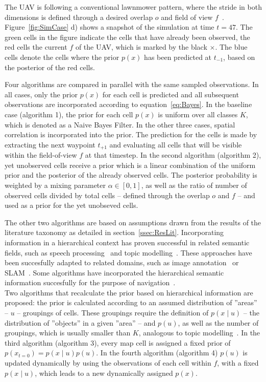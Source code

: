 \documentclass[twocolumn,letterpaper]{IEEEAerospaceCLS}  %
\begin{document}
The UAV is following a conventional lawnmower pattern, where the stride in both dimensions is defined through a desired overlap $o$ and field of view $f$~\cite{shetty_implementation_2020}. Figure~\ref{fig:SimCase} d) shows a snapshot of the simulation at time $t=47$. The green cells in the figure indicate the cells that have already been observed, the red cells the current $f$ of the UAV, which is marked by the black $\pmb{\times}$. The blue cells denote the cells where the prior $p(x)$ has been predicted at $t_{-1}$, based on the posterior of the red cells.

Four algorithms are compared in parallel with the same sampled observations. In all cases, only the prior $p(x)$ for each cell is predicted and all subsequent observations are incorporated according to equation~\ref{eq:Bayes}. In the baseline case (algorithm 1), the prior for each cell $p(x)$ is uniform over all classes $K$, which is denoted as a Naive Bayes Filter. In the other three cases, spatial correlation is incorporated into the prior. The prediction for the cells is made by extracting the next waypoint $t_{+1}$ and evaluating all cells that will be visible within the field-of-view $f$ at that timestep. In the second algorithm (algorithm 2), yet unobserved cells receive a prior which is a linear combination of the uniform prior and the posterior of the already observed cells. The posterior probability is weighted by a mixing parameter $\alpha \in [0, 1]$, as well as the ratio of number of observed cells divided by total cells -- defined through the overlap $o$ and $f$ -- and used as a prior for the yet unobseved cells.

The other two algorithms are based on assumptions drawn from the results of the literature taxonomy as detailed in section~\ref{ssec:ResLit}. Incorporating information in a hierarchical context has proven successful in related semantic fields, such as speech processing~\cite{fine_hierarchical_1998} and topic modelling~\cite{blei_latent_2003}. These approaches have been succesfully adapted to related domains, such as image annotation~\cite{fei-fei_bayesian_2005,lienou_semantic_2010} or SLAM~\cite{zhang_hierarchical_2019}. Some algorithms have incorporated the hierarchical semantic information succesfully for the purpose of navigation~\cite{koch_automatic_2019,chaplot_object_2020,wu_learning_2018,alirezaie_exploiting_2017}.\\
Two algorithms  that recalculate the prior based on hierarchical information are proposed: the prior is calculated according to an assumed distribution of ''areas'' -- $u$ -- groupings of cells. These groupings require the definition of $p(x\mid u)$ -- the distribution of ''objects'' in a given ''area'' -- and $p(u)$, as well as the number of groupings, which is usually smaller than $K$, analogous to topic modelling~\cite{blei_latent_2003}. In the third algorithm (algorithm 3), every map cell is assigned a fixed prior of $p(x_{t=0}) = p(x\mid u) p(u)$. In the fourth algorithm (algorithm 4) $p(u)$ is updated dynamically by using the observations of each cell within $f$, with a fixed $p(x\mid u)$, which leads to a new dynamically assigned $p(x)$.
\end{document}
